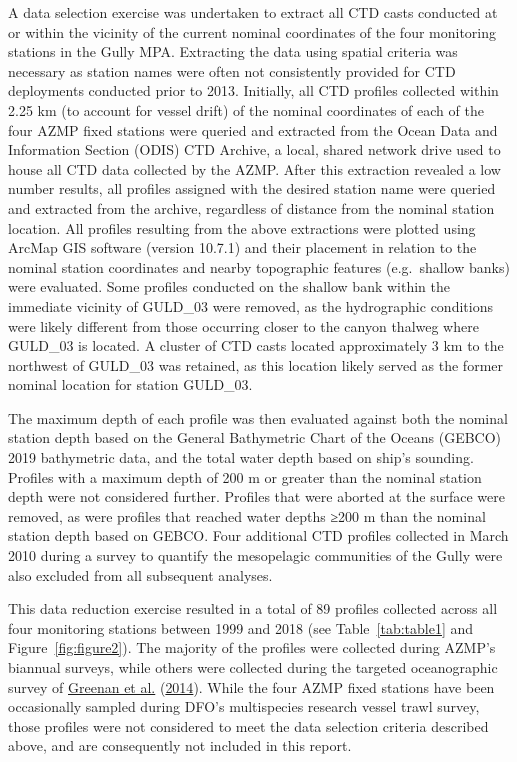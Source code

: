 \documentclass[12pt]{article}\usepackage[]{graphicx}\usepackage[]{color}
\begin{document}
A data selection exercise was undertaken to extract all CTD casts conducted at or within the vicinity of the current nominal coordinates of the four monitoring stations in the Gully MPA. Extracting the data using spatial criteria was necessary as station names were often not consistently provided for CTD deployments conducted prior to 2013. Initially, all CTD profiles collected within 2.25 km (to account for vessel drift) of the nominal coordinates of each of the four AZMP fixed stations were queried and extracted from the Ocean Data and Information Section (ODIS) CTD Archive, a local, shared network drive used to house all CTD data collected by the AZMP. After this extraction revealed a low number results, all profiles assigned with the desired station name were queried and extracted from the archive, regardless of distance from the nominal station location. All profiles resulting from the above extractions were plotted using ArcMap GIS software (version 10.7.1) and their placement in relation to the nominal station coordinates and nearby topographic features (e.g.~shallow banks) were evaluated. Some profiles conducted on the shallow bank within the immediate vicinity of GULD\_03 were removed, as the hydrographic conditions were likely different from those occurring closer to the canyon thalweg where GULD\_03 is located. A cluster of CTD casts located approximately 3 km to the northwest of GULD\_03 was retained, as this location likely served as the former nominal location for station GULD\_03.

The maximum depth of each profile was then evaluated against both the nominal station depth based on the General Bathymetric Chart of the Oceans (GEBCO) 2019 bathymetric data, and the total water depth based on ship's sounding. Profiles with a maximum depth of 200 m or greater than the nominal station depth were not considered further. Profiles that were aborted at the surface were removed, as were profiles that reached water depths ≥200 m than the nominal station depth based on GEBCO. Four additional CTD profiles collected in March 2010 during a survey to quantify the mesopelagic communities of the Gully were also excluded from all subsequent analyses.

This data reduction exercise resulted in a total of 89 profiles collected across all four monitoring stations between 1999 and 2018 (see Table~\ref{tab:table1} and Figure~\ref{fig:figure2}). The majority of the profiles were collected during AZMP's biannual surveys, while others were collected during the targeted oceanographic survey of \protect\hyperlink{ref-greenan_2014}{Greenan et al.} (\protect\hyperlink{ref-greenan_2014}{2014}). While the four AZMP fixed stations have been occasionally sampled during DFO's multispecies research vessel trawl survey, those profiles were not considered to meet the data selection criteria described above, and are consequently not included in this report.
\end{document}
